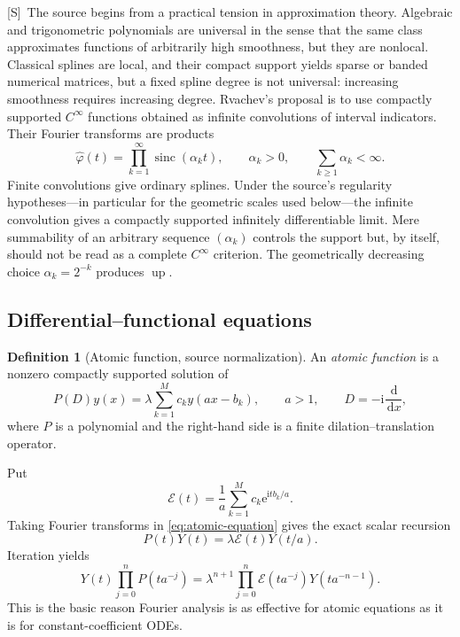 \documentclass[11pt,oneside]{article}
\theoremstyle{definition}
\newtheorem{definition}[theorem]{Definition}
\theoremstyle{remark}
\newcommand{\Up}{\operatorname{up}}
\newcommand{\sinc}{\operatorname{sinc}}
\newcommand{\e}{\mathrm e}
\newcommand{\ii}{\mathrm i}
\newcommand{\dd}{\,\mathrm d}
\newcommand{\Smark}{\textcolor{sourceblue}{\textsf{[S]}}}
\begin{document}
\Smark\ The source begins from a practical tension in approximation theory.  Algebraic and
trigonometric polynomials are universal in the sense that the same class approximates
functions of arbitrarily high smoothness, but they are nonlocal.  Classical splines are local,
and their compact support yields sparse or banded numerical matrices, but a fixed spline
degree is not universal: increasing smoothness requires increasing degree.  Rvachev's
proposal is to use compactly supported $C^\infty$ functions obtained as infinite convolutions
of interval indicators.  Their Fourier transforms are products
\begin{equation}
 \widehat\varphi(t)=\prod_{k=1}^{\infty}\sinc(\alpha_k t),
 \qquad \alpha_k>0,
 \qquad \sum_{k\ge1}\alpha_k<\infty.
 \label{eq:general-sinc-product}
\end{equation}
Finite convolutions give ordinary splines.  Under the source's regularity hypotheses---in
particular for the geometric scales used below---the infinite convolution gives a compactly
supported infinitely differentiable limit.  Mere summability of an arbitrary sequence
$(\alpha_k)$ controls the support but, by itself, should not be read as a complete $C^\infty$
criterion.  The geometrically decreasing choice $\alpha_k=2^{-k}$ produces $\Up$.

\subsection{Differential--functional equations}

\begin{definition}[Atomic function, source normalization]
\label{def:atomic}
An \emph{atomic function} is a nonzero compactly supported solution of
\begin{equation}
 P(D)y(x)=\lambda\sum_{k=1}^{M}c_k y(ax-b_k),
 \qquad a>1,
 \qquad D=-\ii\frac{\dd}{\dd x},
 \label{eq:atomic-equation}
\end{equation}
where $P$ is a polynomial and the right-hand side is a finite dilation--translation operator.
\end{definition}

Put
\begin{equation}
 \mathcal E(t)=\frac1a\sum_{k=1}^{M}c_k\e^{\ii tb_k/a}.
 \label{eq:E-mask}
\end{equation}
Taking Fourier transforms in \eqref{eq:atomic-equation} gives the exact scalar recursion
\begin{equation}
 P(t)Y(t)=\lambda\mathcal E(t)Y(t/a).
 \tag{S3.2}
 \label{eq:fourier-recursion-general}
\end{equation}
Iteration yields
\begin{equation}
 Y(t)\prod_{j=0}^{n}P(ta^{-j})
 =\lambda^{n+1}\prod_{j=0}^{n}\mathcal E(ta^{-j})Y(ta^{-n-1}).
 \tag{S3.7}
 \label{eq:iterated-general}
\end{equation}
This is the basic reason Fourier analysis is as effective for atomic equations as it is for
constant-coefficient ODEs.
\end{document}
